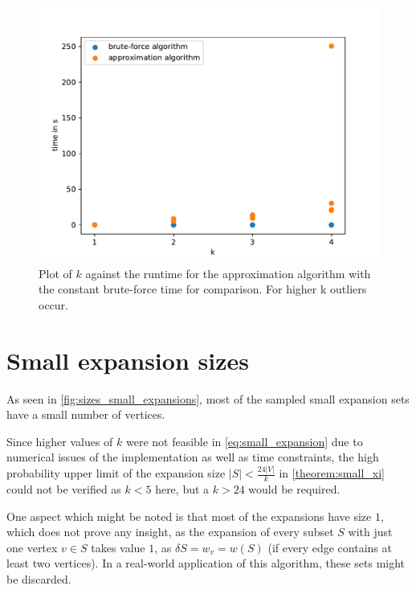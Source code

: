 \begin{figure}
	\centering
	\includegraphics[scale=0.8]{figures/k_all_logs.pdf}
	\caption[Plot k against time]{Plot of $k$ against the runtime for the approximation algorithm with the constant brute-force time for comparison. For higher k outliers occur.\label{fig:k_time}}
\end{figure}

\section{Small expansion sizes}

As seen in \cref{fig:sizes_small_expansions}, most of the sampled small expansion sets have a small number of vertices. %


Since higher values of $k$ were not feasible in \cref{eq:small_expansion} due to numerical issues of the implementation as well as time constraints, the high probability upper limit of the expansion size $|S|<\frac{24|V|}{k}$ in \cref{theorem:small_xi} could not be verified as $k<5$ here, but a $k>24$ would be required.

One aspect which might be noted is that most of the expansions have size $1$, which does not prove any insight, as the expansion of every subset $S$ with just one vertex $v\in S$ takes value $1$, as $\delta S = w_v = w(S)$ (if every edge contains at least two vertices). In a real-world application of this algorithm, these sets might be discarded.


